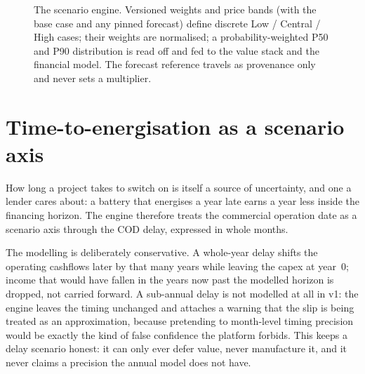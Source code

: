 \begin{figure}[H]
{}
\caption{The scenario engine. Versioned weights and price bands (with the base case and any pinned forecast) define discrete Low / Central / High cases; their weights are normalised; a probability-weighted P50 and P90 distribution is read off and fed to the value stack and the financial model. The forecast reference travels as provenance only and never sets a multiplier.}
\label{fig:scenflow}
\end{figure}

\section{Time-to-energisation as a scenario axis}

How long a project takes to switch on is itself a source of uncertainty, and one a lender cares about: a battery that energises a year late earns a year less inside the financing horizon. The engine therefore treats the commercial operation date as a scenario axis through the COD delay, expressed in whole months.

The modelling is deliberately conservative. A whole-year delay shifts the operating cashflows later by that many years while leaving the capex at year~0; income that would have fallen in the years now past the modelled horizon is dropped, not carried forward. A sub-annual delay is not modelled at all in v1: the engine leaves the timing unchanged and attaches a warning that the slip is being treated as an approximation, because pretending to month-level timing precision would be exactly the kind of false confidence the platform forbids. This keeps a delay scenario honest: it can only ever defer value, never manufacture it, and it never claims a precision the annual model does not have.

